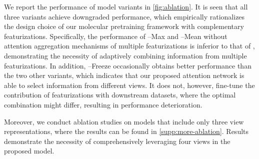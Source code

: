 We report the performance of model variants in \cref{fig:ablation}.
It is seen that all three variants achieve downgraded performance, which empirically rationalizes the design choice of our molecular pretraining framework with complementary featurizations.
Specifically, the performance of \themodel --Max and \themodel --Mean without attention aggregation mechanisms of multiple featurizations is inferior to that of \themodel, demonstrating the necessity of adaptively combining information from multiple featurizations.
In addition, \themodel --Freeze occasionally obtains better performance than the two other variants, which indicates that our proposed attention network is able to select information from different views.
It does not, however, fine-tune the contribution of featurizations with downstream datasets, where the optimal combination might differ, resulting in performance deterioration.

Moreover, we conduct ablation studies on models that include only three view representations, where the results can be found in \cref{supp:more-ablation}. Results demonstrate the necessity of comprehensively leveraging four views in the proposed \themodel model.
